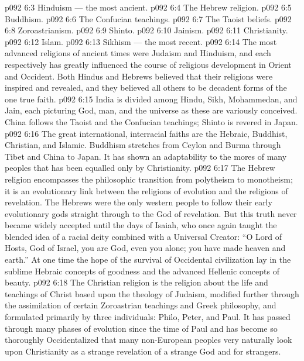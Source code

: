 \vs p092 6:3 \bibnobreakspace Hinduism --- the most ancient.
\vs p092 6:4 \bibnobreakspace The Hebrew religion.
\vs p092 6:5 \bibnobreakspace Buddhism.
\vs p092 6:6 \bibnobreakspace The Confucian teachings.
\vs p092 6:7 \bibnobreakspace The Taoist beliefs.
\vs p092 6:8 \bibnobreakspace Zoroastrianism.
\vs p092 6:9 \bibnobreakspace Shinto.
\vs p092 6:10 \bibnobreakspace Jainism.
\vs p092 6:11 \bibnobreakspace Christianity.
\vs p092 6:12 \bibnobreakspace Islam.
\vs p092 6:13 \bibnobreakspace Sikhism --- the most recent.
\vs p092 6:14 \pc The most advanced religions of ancient times were Judaism and Hinduism, and each respectively has greatly influenced the course of religious development in Orient and Occident. Both Hindus and Hebrews believed that their religions were inspired and revealed, and they believed all others to be decadent forms of the one true faith.
\vs p092 6:15 India is divided among Hindu, Sikh, Mohammedan, and Jain, each picturing God, man, and the universe as these are variously conceived. China follows the Taoist and the Confucian teachings; Shinto is revered in Japan.
\vs p092 6:16 The great international, interracial faiths are the Hebraic, Buddhist, Christian, and Islamic. Buddhism stretches from Ceylon and Burma through Tibet and China to Japan. It has shown an adaptability to the mores of many peoples that has been equalled only by Christianity.
\vs p092 6:17 The Hebrew religion encompasses the philosophic transition from polytheism to monotheism; it is an evolutionary link between the religions of evolution and the religions of revelation. The Hebrews were the only western people to follow their early evolutionary gods straight through to the God of revelation. But this truth never became widely accepted until the days of Isaiah, who once again taught the blended idea of a racial deity combined with a Universal Creator: “O Lord of Hosts, God of Israel, you are God, even you alone; you have made heaven and earth.” At one time the hope of the survival of Occidental civilization lay in the sublime Hebraic concepts of goodness and the advanced Hellenic concepts of beauty.
\vs p092 6:18 The Christian religion is the religion about the life and teachings of Christ based upon the theology of Judaism, modified further through the assimilation of certain Zoroastrian teachings and Greek philosophy, and formulated primarily by three individuals: Philo, Peter, and Paul. It has passed through many phases of evolution since the time of Paul and has become so thoroughly Occidentalized that many non\hyp{}European peoples very naturally look upon Christianity as a strange revelation of a strange God and for strangers.
